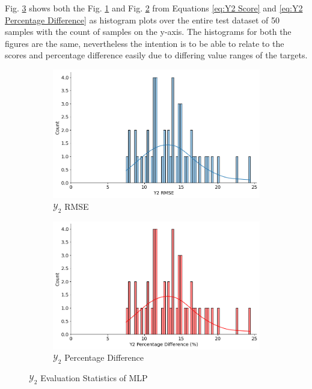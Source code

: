 \documentclass{report} %
\begin{document}
Fig. \ref{fig:Y2 Evaluation Statistics MLP} shows both the Fig. \ref{fig:Y2 RMSE} and Fig. \ref{fig:Y2 Percentage Difference} from Equations \ref{eq:Y2 Score} 
and \ref{eq:Y2 Percentage Difference} as histogram plots over the entire test dataset of 50 samples with the count of samples on the y-axis.
The histograms for both the figures are the same, nevertheless the intention is to be able to relate to the scores and percentage difference easily due to differing 
value ranges of the targets.
\begin{figure}[H]
    \centering
    \begin{subfigure}{0.5\textwidth}
        \centering
        \includegraphics[width=\textwidth]{./ReportImages/score_MLP_y2.png}
        \caption{$\mathcal{Y}_2$ \ac{RMSE}}
        \label{fig:Y2 RMSE}
    \end{subfigure}\hfill
    \begin{subfigure}{0.5\textwidth}
        \centering
        \includegraphics[width=\textwidth]{./ReportImages/percentage_diff_MLP_y2.png}
        \caption{$\mathcal{Y}_2$ Percentage Difference}
        \label{fig:Y2 Percentage Difference}
    \end{subfigure}
    \caption{$\mathcal{Y}_2$ Evaluation Statistics of \ac{MLP}}
    \label{fig:Y2 Evaluation Statistics MLP}
\end{figure}
\end{document}
